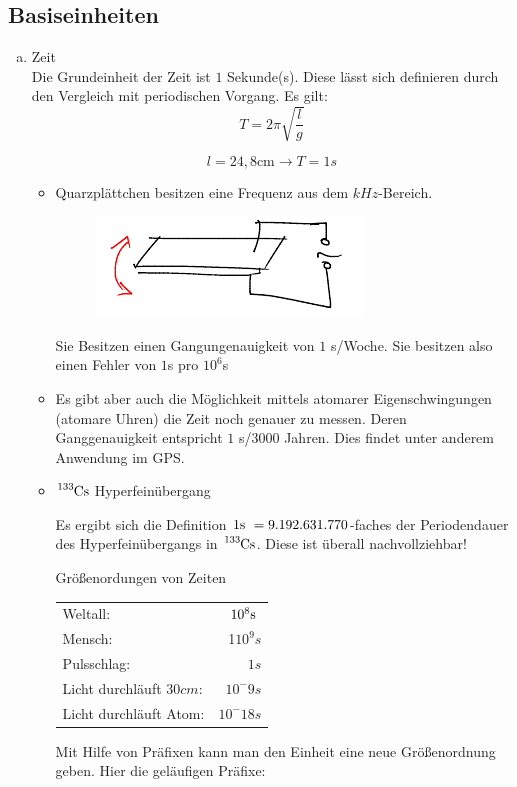 \documentclass[a4paper,10pt]{scrartcl}
\begin{document}
 \subsection{Basiseinheiten}
 \begin{enumerate}[a)]
\item Zeit \\
Die Grundeinheit der Zeit ist $1$ Sekunde(s).  Diese lässt sich definieren durch den Vergleich mit periodischen Vorgang. Es gilt:
\[
\boxed{T=2\pi \sqrt{\frac{l}{g}}}
\]

\[
l=24,8 \text{cm} \rightarrow T=1s
\]
\begin{itemize}
\item Quarzplättchen besitzen eine Frequenz aus dem $kHz$-Bereich.
\begin{figure}[h]
\includegraphics[scale=0.5]{fig5.png}
\end{figure}

Sie Besitzen einen Gangungenauigkeit von $1$ s/Woche. Sie besitzen also einen Fehler von $1$s pro $10^6$s
\item Es gibt aber auch die Möglichkeit mittels atomarer Eigenschwingungen (atomare Uhren) die Zeit noch genauer zu messen.  Deren Ganggenauigkeit entspricht $1$ s/$3000$ Jahren. Dies findet unter anderem Anwendung im GPS. 
\item $\ce{^{133}Cs}$ Hyperfeinübergang

Es ergibt sich die Definition $1\text{s }=9.192.631.770$-faches der Periodendauer des Hyperfeinübergangs in $\ce{^{133}Cs}$. Diese ist überall nachvollziehbar!
\newpage
 \begin{seg}{Größenordungen von Zeiten}
 
 \begin{center}
 \begin{tabular}{l r}
 Weltall: & $10^8 \text{s }$ \\
 Mensch: & 1$10^9 s$ \\
 Pulsschlag: & $1 s$ \\
 Licht durchläuft $30 cm$: & $10^-9 s$ \\
 Licht durchläuft Atom: & $10^-18 s$
 \end{tabular}
 \end{center}
 \end{seg} 
Mit Hilfe von Präfixen kann man den Einheit eine neue Größenordnung geben. Hier die geläufigen Präfixe:


\end{itemize}
\end{enumerate}
\end{document}
